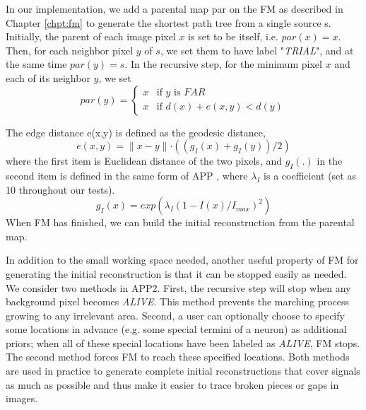 In our implementation, we add a parental map par on the FM as described in Chapter \ref{chpt:fm} to generate the shortest path tree from a single source s.  Initially, the parent of each image pixel $x$ is set to be itself, i.e. $par(x)=x$. Then, for each neighbor pixel $y$ of $s$, we set them to have label "\emph{TRIAL}", and at the same time $par(y)=s$. In the recursive step, for the minimum pixel $x$ and each of its neighbor $y$, we set
\begin{equation}
par(y) = \left\{
\begin{array}{cl}
x & \mbox{if }y\mbox{ is }FAR \\
x & \mbox{if }d(x)+ e(x,y)< d(y)
\end{array}
\right.
\end{equation}

The edge distance e(x,y) is defined as the geodesic distance,
\begin{equation}
e(x,y)=\parallel x-y\parallel\cdot((g_I (x)+ g_I (y))/2)
\end{equation}
where the first item is Euclidean distance of the two pixels, and $g_I (.)$ in the second item is defined in the same form of APP \cite{peng2011automatic}, where $λ_I$ is a coefficient (set as 10 throughout our tests). 
\begin{equation}
g_I (x)=exp⁡(\lambda_I (1-I(x)/I_{max} )^2 )
\end{equation}
When FM has finished, we can build the initial reconstruction from the parental map.

In addition to the small working space needed, another useful property of FM for generating the initial reconstruction is that it can be stopped easily as needed. We consider two methods in APP2. First, the recursive step will stop when any background pixel becomes \emph{ALIVE}. This method prevents the marching process growing to any irrelevant area. Second, a user can optionally choose to specify some locations in advance (e.g. some special termini of a neuron) as additional priors; when all of these special locations have been labeled as \emph{ALIVE}, FM stops. The second method forces FM to reach these specified locations. Both methods are used in practice to generate complete initial reconstructions that cover signals as much as possible and thus make it easier to trace broken pieces or gaps in images. 

